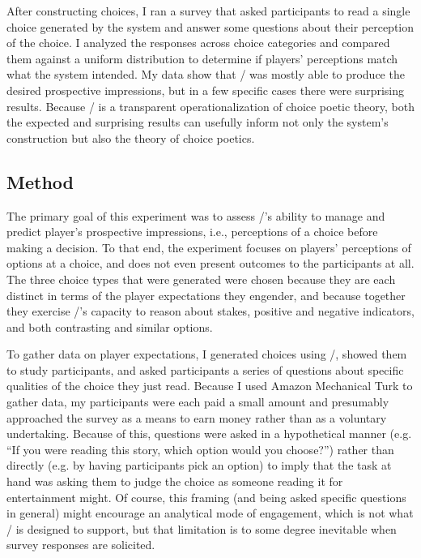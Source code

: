 After constructing choices, I ran a survey that asked participants to read a single choice generated by the system and answer some questions about their perception of the choice.
%
I analyzed the responses across choice categories and compared them against a uniform distribution to determine if players' perceptions match what the system intended.
%
My data show that \dunyazad/ was mostly able to produce the desired prospective impressions, but in a few specific cases there were surprising results.
%
Because \dunyazad/ is a transparent operationalization of choice poetic theory, both the expected and surprising results can usefully inform not only the system's construction but also the theory of choice poetics.


\subsection{Method}

The primary goal of this experiment was to assess \dunyazad/'s ability to manage and predict player's prospective impressions, i.e., perceptions of a choice before making a decision.
%
To that end, the experiment focuses on players' perceptions of options at a choice, and does not even present outcomes to the participants at all.
%
The three choice types that were generated were chosen because they are each distinct in terms of the player expectations they engender, and because together they exercise \dunyazad/'s capacity to reason about stakes, positive and negative indicators, and both contrasting and similar options.


To gather data on player expectations, I generated choices using \dunyazad/, showed them to study participants, and asked participants a series of questions about specific qualities of the choice they just read.
%
Because I used Amazon Mechanical Turk to gather data, my participants were each paid a small amount and presumably approached the survey as a means to earn money rather than as a voluntary undertaking.
%
Because of this, questions were asked in a hypothetical manner (e.g. ``If you were reading this story, which option would you choose?'') rather than directly (e.g. by having participants pick an option) to imply that the task at hand was asking them to judge the choice as someone reading it for entertainment might.
%
Of course, this framing (and being asked specific questions in general) might encourage an analytical mode of engagement, which is not what \dunyazad/ is designed to support, but that limitation is to some degree inevitable when survey responses are solicited.


